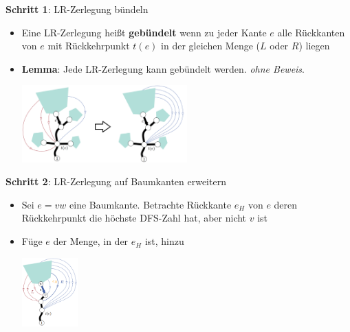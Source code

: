 \textbf{Schritt 1}: LR-Zerlegung bündeln
\begin{itemize}
	\item Eine LR-Zerlegung heißt \textbf{gebündelt} wenn zu jeder Kante $e$ alle Rückkanten von $e$ mit Rückkehrpunkt $t(e)$ in der gleichen Menge ($L$ oder $R$) liegen
	\item \textbf{Lemma}: Jede LR-Zerlegung kann gebündelt werden. \qquad \textit{ohne Beweis}.
	\begin{center}
		\includegraphics[width=0.5\textwidth]{images/lr-3.png}
	\end{center}
\end{itemize}

\textbf{Schritt 2}: LR-Zerlegung auf Baumkanten erweitern
\begin{itemize}
	\item Sei $e = vw$ eine Baumkante. Betrachte Rückkante $e_H$ von $e$ deren Rückkehrpunkt die höchste DFS-Zahl hat, aber nicht $v$ ist
	\item Füge $e$ der Menge, in der $e_H$ ist, hinzu
	\begin{center}
		\includegraphics[width=0.17\textwidth]{images/lr-4.png}
	\end{center}
\end{itemize}

